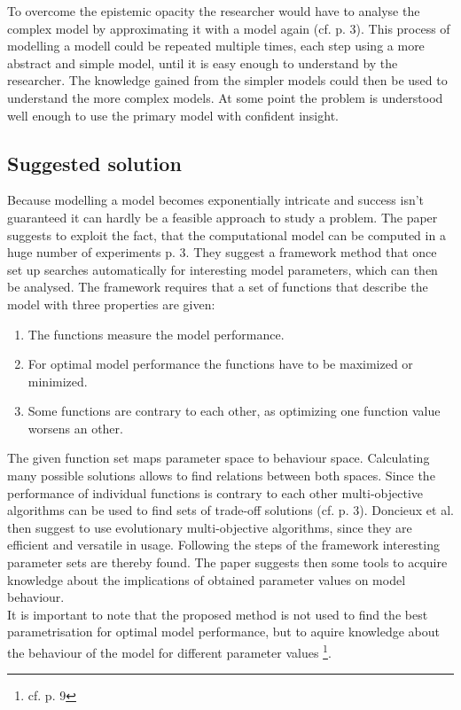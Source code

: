 \documentclass[12pt,twoside]{article}
\theoremstyle{plain}
\theoremstyle{definition}
\theoremstyle{remark}
\begin{document}
To overcome the epistemic opacity the researcher would have to analyse the complex model by approximating it with a model again (cf. \cite{doncieux2015multi} p. 3). This process of modelling a modell could be repeated multiple times, each step using a more abstract and simple model, until it is easy enough to understand by the researcher. The knowledge gained from the simpler models could then be used to understand the more complex models. At some point the problem is understood well enough to use the primary model with confident insight.

\subsection{Suggested solution}
Because modelling a model becomes exponentially intricate and success isn't guaranteed it can hardly be a feasible approach to study a problem. The paper suggests to exploit the fact, that the computational model can be computed in a \glqq huge number of experiments\grqq{} \cite{doncieux2015multi} p. 3.
They suggest a framework method that once set up searches automatically for interesting model parameters, which can then be analysed.
The framework requires that a set of functions that describe the model with three properties are given:
\begin{enumerate}
	\item The functions measure the model performance.
	\item For optimal model performance the functions have to be maximized or minimized.
	\item Some functions are contrary to each other, as optimizing one function value worsens an other.
\end{enumerate}
The given function set maps parameter space to behaviour space. Calculating many possible solutions allows to find relations between both spaces.
Since the performance of individual functions is contrary to each other multi-objective algorithms can be used to find sets of trade-off solutions (cf. \cite{doncieux2015multi} p. 3).
Doncieux et al. then suggest to use evolutionary multi-objective algorithms, since they are efficient and versatile in usage. Following the steps of the framework interesting parameter sets are thereby found.
The paper suggests then some tools to acquire knowledge about the implications of obtained parameter values on model behaviour.\\
It is important to note that the proposed method is not used to find the best parametrisation for optimal model performance, but to aquire knowledge about the behaviour of the model for different parameter values \footnote{cf. \cite{doncieux2015multi} p. 9}.
\end{document}
